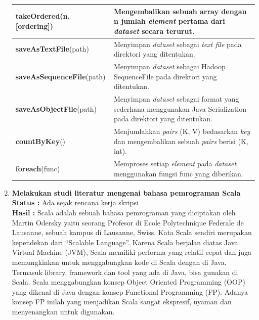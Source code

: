 \documentclass[a4paper,twoside]{article}
\begin{document}
\begin{enumerate}
\begin{table}[H]
\begin{tabular}{p{6cm}p{9cm}	}
\hline
\textbf{takeOrdered}(n, [ordering]) & Mengembalikan sebuah array dengan n jumlah \textit{element} pertama dari \textit{dataset} secara terurut. \\

\hline
\textbf{saveAsTextFile}(path) & Menyimpan \textit{dataset} sebagai \textit{text file} pada direktori yang ditentukan. \\

\hline
\textbf{saveAsSequenceFile}(path) & Menyimpan \textit{dataset} sebagai Hadoop SequenceFile pada direktori yang ditentukan.\\

\hline
\textbf{saveAsObjectFile}(path) & Menyimpan \textit{dataset} sebagai format yang sederhana menggunakan Java Serialization pada direktori yang ditentukan.\\

\hline
\textbf{countByKey}() & Menjumlahkan \textit{pairs} (K, V) bedasarkan \textit{key} dan mengembalikan sebuah \textit{pairs} berisi (K, int). \\

\hline
\textbf{foreach}(func) & Memproses setiap \textit{element} pada \textit{dataset} menggunakan fungsi func yang diberikan. \\

\hline



	\end{tabular} 
\end{table}
		
		
		
		\item \textbf{Melakukan studi literatur mengenai bahasa pemrograman Scala}\\
		{\bf Status :} Ada sejak rencana kerja skripsi \\
		{\bf Hasil :} Scala adalah sebuah bahasa pemrograman yang diciptakan oleh Martin Odersky yaitu seorang Profesor di Ecole Polytechnique Federale de Lausanne, sebuah kampus di Lausanne, Swiss. Kata Scala sendiri merupakan kependekan dari “Scalable Language”. Karena Scala berjalan diatas Java Virtual Machine (JVM), Scala memiliki performa yang relatif cepat dan juga memungkinkan untuk menggabungkan kode di Scala dengan di Java. Termasuk library, framework dan tool yang ada di Java, bisa gunakan di Scala. Scala menggabungkan konsep Object Oriented Programming (OOP) yang dikenal di Java dengan konsep Functional Programming (FP). Adanya konsep FP inilah yang menjadikan Scala sangat ekspresif, nyaman dan menyenangkan untuk digunakan. \\


\end{enumerate}
\end{document}
